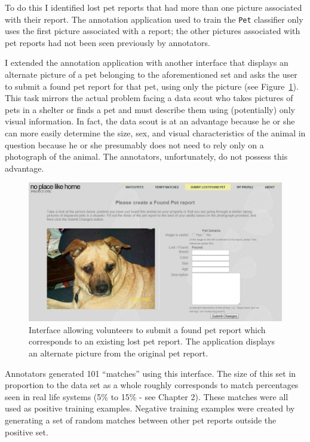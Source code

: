 To do this I identified lost pet reports that had more than one picture associated with their report.  The annotation application used to train the {\tt Pet} classifier only uses the first picture associated with a report; the other pictures associated with pet reports had not been seen previously by annotators.

I extended the annotation application with another interface that displays an alternate picture of a pet belonging to the aforementioned set and asks the user to submit a found pet report for that pet, using only the picture (see Figure~\ref{fig:annotation2}).  This task mirrors the actual problem facing a data scout who takes pictures of pets in a shelter or finds a pet and must describe them using (potentially) only visual information.  In fact, the data scout is at an advantage because he or she can more easily determine the size, sex, and visual characteristics of the animal in question because he or she presumably does not need to rely only on a photograph of the animal.  The annotators, unfortunately, do not possess this advantage.

\begin{figure}[htbp]
    \begin{center}
	\includegraphics[width=150mm]{figs/annotation2.png}
    \end{center}
        \caption[{\tt Match} classifier Annotation Interface]{
        Interface allowing volunteers to submit a found pet report which corresponds to an existing lost pet report.  The application displays an alternate picture from the original pet report.
	}
	 \label{fig:annotation2}
\end{figure}

Annotators generated 101 ``matches'' using this interface.  The size of this set in proportion to the data set as a whole roughly corresponds to match percentages seen in real life systems (5\% to 15\% - see Chapter 2).  These matches were all used as positive training examples.  Negative training examples were created by generating a set of random matches between other pet reports outside the positive set.


